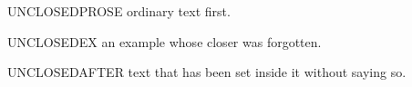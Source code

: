 

UNCLOSEDPROSE ordinary text first.

\ea UNCLOSEDEX an example whose closer was forgotten.

UNCLOSEDAFTER text that has been set inside it without saying so.

